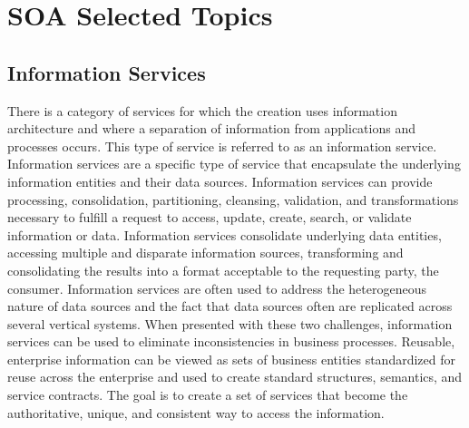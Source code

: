 \documentclass[12pt,a4paper,final,twoside,onecolumn,titlepage]{book}
\begin{document}
\section{SOA Selected Topics}
\subsection{Information Services}
There is a category of services for which the creation uses information architecture and where a separation of information from applications and processes occurs. This type of service is referred to as an information service. Information services are a specific type of service that encapsulate the underlying information entities and their data sources. Information services can provide processing, consolidation, partitioning, cleansing, validation, and transformations necessary to fulfill a request to access, update, create, search, or validate information or data. Information services consolidate underlying data entities, accessing multiple and disparate information sources, transforming and consolidating the results into a format acceptable to the requesting party, the consumer.
Information services are often used to address the heterogeneous nature of data sources and the fact that data sources often are replicated across several vertical systems. When presented with these two challenges, information services can be used to eliminate inconsistencies in business processes. Reusable, enterprise information can be viewed as sets of business entities standardized for reuse across the enterprise and used to create standard structures, semantics, and service contracts. The goal is to create a set of services that become the authoritative, unique, and consistent way to access the information.
\end{document}

